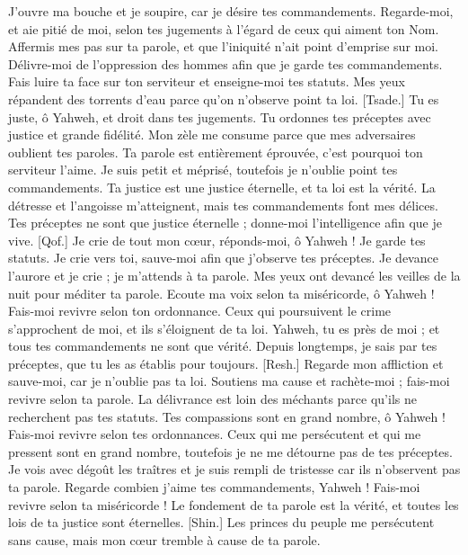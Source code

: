 \begin{multicols}{2}
J'ouvre ma bouche et je soupire, car je désire tes commandements.
Regarde-moi, et aie pitié de moi, selon tes jugements à l'égard de ceux qui aiment ton Nom.
Affermis mes pas sur ta parole, et que l'iniquité n'ait point d'emprise sur moi.
Délivre-moi de l'oppression des hommes afin que je garde tes commandements.
Fais luire ta face sur ton serviteur et enseigne-moi tes statuts.
Mes yeux répandent des torrents d'eau parce qu'on n'observe point ta loi.
[Tsade.] Tu es juste, ô Yahweh, et droit dans tes jugements.
Tu ordonnes tes préceptes avec justice et grande fidélité.
Mon zèle me consume parce que mes adversaires oublient tes paroles.
Ta parole est entièrement éprouvée, c'est pourquoi ton serviteur l'aime.
Je suis petit et méprisé, toutefois je n'oublie point tes commandements.
Ta justice est une justice éternelle, et ta loi est la vérité.
La détresse et l'angoisse m'atteignent, mais tes commandements font mes délices.
Tes préceptes ne sont que justice éternelle ; donne-moi l'intelligence afin que je vive.
[Qof.] Je crie de tout mon cœur, réponds-moi, ô Yahweh ! Je garde tes statuts.
Je crie vers toi, sauve-moi afin que j'observe tes préceptes.
Je devance l'aurore et je crie ; je m'attends à ta parole.
Mes yeux ont devancé les veilles de la nuit pour méditer ta parole.
Ecoute ma voix selon ta miséricorde, ô Yahweh ! Fais-moi revivre selon ton ordonnance.
Ceux qui poursuivent le crime s'approchent de moi, et ils s'éloignent de ta loi.
Yahweh, tu es près de moi ; et tous tes commandements ne sont que vérité.
Depuis longtemps, je sais par tes préceptes, que tu les as établis pour toujours.
[Resh.] Regarde mon affliction et sauve-moi, car je n'oublie pas ta loi.
Soutiens ma cause et rachète-moi ; fais-moi revivre selon ta parole.
La délivrance est loin des méchants parce qu'ils ne recherchent pas tes statuts.
Tes compassions sont en grand nombre, ô Yahweh ! Fais-moi revivre selon tes ordonnances.
Ceux qui me persécutent et qui me pressent sont en grand nombre, toutefois je ne me détourne pas de tes préceptes.
Je vois avec dégoût les traîtres et je suis rempli de tristesse car ils n'observent pas ta parole.
Regarde combien j'aime tes commandements, Yahweh ! Fais-moi revivre selon ta miséricorde !
Le fondement de ta parole est la vérité, et toutes les lois de ta justice sont éternelles.
[Shin.] Les princes du peuple me persécutent sans cause, mais mon cœur tremble à cause de ta parole.

\end{multicols}
